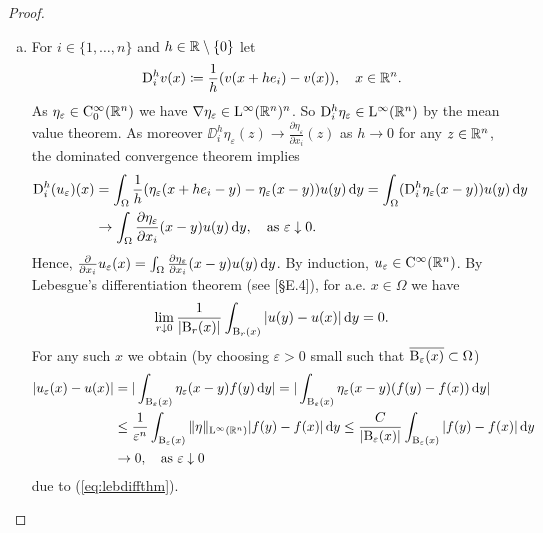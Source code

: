 \begin{proof}
  \begin{enumerate}[a)]
    \item For $i \in \{1, \dots, n\}$ and $h \in \mathbb{R} \setminus\{0\}$ let
    $$
    \mathrm{D}^h_i v(x) \coloneqq \frac{1}{h} ( v(x + h e_i) - v(x)), \quad x \in \mathbb{R}^n.
    $$
    As $\eta_\varepsilon \in \mathrm{C}_0^\infty(\mathbb{R}^n)$ we have $\nabla \eta_\varepsilon \in \mathrm{L}^\infty(\mathbb{R}^n)^n$.
    So $\mathrm{D}_i^h  \eta_\varepsilon \in \mathrm{L}^\infty(\mathbb{R}^n)$ by the mean value theorem.
    As moreover $\DD_i^h \eta_\varepsilon(z) \to \frac{\partial \eta_\varepsilon}{\partial x_i}(z)$ as $h \to 0$ for any $z \in \mathbb{R}^n$, the dominated convergence theorem implies
    \begin{align*}
      \mathrm{D}_i^h (u_\varepsilon)(x)
    &= \int_\Omega \frac{1}{h} (\eta_\varepsilon(x + h e_i - y) - \eta_\varepsilon (x - y)) u(y) \, {\operatorname{d}\!{y}} 
    = \int_\Omega (\mathrm{D}_i^h \eta_\varepsilon (x - y)) u(y) \, {\operatorname{d}\!{y}}  \\
    &\to \int_\Omega \frac{\partial \eta_\varepsilon}{\partial x_i}(x - y) u(y) \, {\operatorname{d}\!{y}}, \quad\text{as } \varepsilon \downarrow 0.
    \end{align*}
    Hence, $\frac{\partial}{\partial x_i} u_\varepsilon(x) = \int_\Omega \frac{\partial \eta_\varepsilon}{\partial x_i} (x - y) u(y) \, {\operatorname{d}\!{y}}$.
    By induction, $u_\varepsilon \in \mathrm{C}^\infty(\mathbb{R}^n)$.
    By Lebesgue's differentiation theorem (see \cite{evans2010partial}[\S E.4]), for a.e. $x \in \Omega$ we have
    \begin{equation}
      \lim_{r \downarrow 0} \frac{1}{|\mathrm{B}_r(x)|} \int_{\mathrm{B}_r(x)} |u(y) - u(x)| \, {\operatorname{d}\!{y}} = 0.
      \label{eq:lebdiffthm}
    \end{equation}
    For any such $x$ we obtain (by choosing $\varepsilon > 0$ small such that $\overline{\mathrm{B}_\varepsilon(x)} \subset \Omega$)
    \begin{align}
      |u_\varepsilon(x) - u(x)|
      &= | \int_{\mathrm{B}_\varepsilon(x)} \eta_\varepsilon (x - y) f(y) \, {\operatorname{d}\!{y}} | 
      = | \int_{\mathrm{B}_\varepsilon(x)} \eta_\varepsilon (x - y) (f(y) - f(x)) \, {\operatorname{d}\!{y}} | \nonumber\\
      &\leq \frac{1}{\varepsilon^n} \int_{\mathrm{B}_\varepsilon(x)} \|\eta\|_{\mathrm{L}^\infty(\mathbb{R}^n)} |f(y) - f(x)| \, {\operatorname{d}\!{y}} \leq \frac{C}{|\mathrm{B}_\varepsilon(x)|} \int_{\mathrm{B}_\varepsilon(x)} |f(y) - f(x) | \, {\operatorname{d}\!{y}} \label{eq:pointwise}\\
      & \to 0, \quad\text{as } \varepsilon \downarrow 0 \nonumber
    \end{align}
    due to (\ref{eq:lebdiffthm}).
    

\end{enumerate}
\end{proof}

